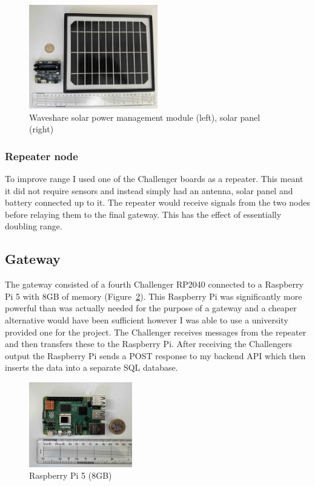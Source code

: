 \begin{figure}[H]
    \centering
    \includegraphics[width=0.5\textwidth]{contents/part-2/fig2/solar-panel-manager.jpg}
    \caption{Waveshare solar power management module (left), solar panel (right)}
    \label{fig:solar-module}
\end{figure}

\subsubsection{Repeater node}

To improve range I used one of the Challenger boards as a repeater. This meant
it did not require sensors and instead simply had an antenna, solar panel and
battery connected up to it. The repeater would receive signals from the two
nodes before relaying them to the final gateway. This has the effect of
essentially doubling range.

\subsection{Gateway}

The gateway consisted of a fourth Challenger RP2040 connected to a Raspberry Pi
5 with 8GB of memory (Figure~\ref{fig:raspberry-pi}). This Raspberry Pi was
significantly more powerful than was actually needed for the purpose of a
gateway and a cheaper alternative would have been sufficient however I was able
to use a university provided one for the project. The Challenger receives
messages from the repeater and then transfers these to the Raspberry Pi. After
receiving the Challengers output the Raspberry Pi sends a POST response to my
backend API which then inserts the data into a separate SQL database.

\begin{figure}[H]
    \centering
    \includegraphics[width=0.4\textwidth]{contents/part-2/fig2/raspberry-pi.jpg}
    \caption{Raspberry Pi 5 (8GB)}
    \label{fig:raspberry-pi}
\end{figure}

